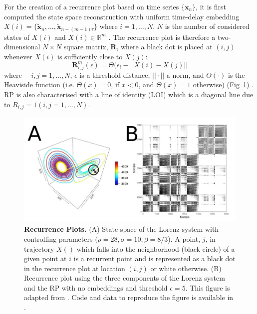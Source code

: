 \documentclass[fleqn,10pt]{wlscirep}
\begin{document}
For the creation of a recurrence plot based on time series 
$\{ \boldsymbol{x}_n \}$, it is first computed the state space 
reconstruction with uniform time-delay embedding 
$X(i)=\{ \boldsymbol{ \tilde{x} }_n, \dots,  
\boldsymbol{ \tilde{x} }_{n -(m-1)\tau} \}$
where $i=1,\dots,N$, $N$ is the number of considered states of $X(i)$ 
and $X(i) \in \mathbb{R}^m$ \cite{eckmann1987}.
The recurrence plot is therefore a two-dimensional $N \times N$ square 
matrix, $\mathbf{R}$, where a black dot is placed at $(i,j)$ 
whenever $X(i)$ is sufficiently close to $X(j)$: 
\begin{equation}
\mathbf{R}^{m}_{i,j} (\epsilon) = \Theta ( \epsilon_i - || X(i) - X(j) ||
\end{equation}
where $\quad i,j=1,\dots,N$, $\epsilon$ is a threshold distance, 
$|| \cdotp ||$ a norm, and $\Theta(\cdotp)$ is the Heaviside 
function (i.e. $\Theta(x)=0$, if $x<0$, and $\Theta(x)=1$ otherwise) 
(Fig~\ref{fig:mrp}) \cite{eckmann1987, marwan2007,marwan2015}.
RP is also characterised with a line of identity (LOI) which is a  
diagonal line due to $ R_{i,j}=1 (i,j=1,\dots,N)$. 
\begin{figure}[ht]
\centering
\includegraphics[width=1.0\textwidth]{rp}
    \caption{
	{\bf Recurrence Plots.} 
	(A) State space of the Lorenz system with controlling parameters 
	($\rho=28, \sigma=10, \beta=8/3$). 
	A point, $j$, in trajectory $X()$ which falls into the neighborhood 
	(black circle) of a given point at $i$ is a recurrent point and is 
	represented as a black dot in the recurrence plot at location 
	$(i, j)$ or white otherwise.
	(B) Recurrence plot using the 
	three components of the Lorenz system and the RP with no embeddings 
	and threshold $\epsilon=5$.
	This figure is adapted from \cite{marwan2015}.
	Code and data to reproduce the figure is available in \cite{srep2020}.
	}
    \label{fig:mrp}
\end{figure}
\end{document}
